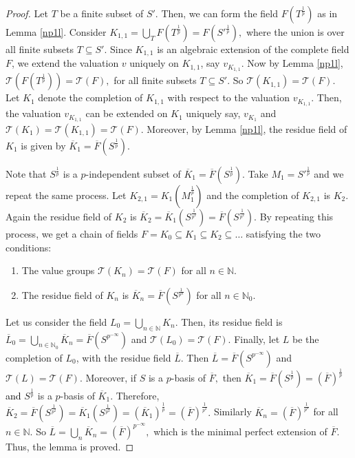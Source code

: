 \documentclass[times,10pt]{amsart}
\newcommand{\N}{\ensuremath{\mathbb{N}}}
\begin{document}
{\begin{proof}
Let $T$ be a finite subset of $S'$. Then, we can form the field $F\left(T^{\frac{1}{p}}\right)$ as in  Lemma \ref{np1l}.  Consider $K_{1,1}= {\bigcup}_T F\left(T^{\frac{1}{p}}\right)= F\left({S'}^{\frac{1}{p}}\right),$  where the union is over all finite subsets  $ T\subseteq S'.$ Since $K_{1,1}$ is an algebraic extension of the complete field $F$,   we  extend the valuation $v$ uniquely  on $K_{1,1}$, say $v_{K_{1,1}}$.   Now by  Lemma \ref{np1l},    $ \mathcal{T}\left(F\left(T^{\frac{1}{p}}\right)\right)= \mathcal{T}(F), $ for all  finite subsets  $T\subseteq S'$. So $  \mathcal{T}(K_{1,1})=\mathcal{T}(F)$.  Let $ K_1$ denote  the completion  of $ K_{1,1}$ with respect to the valuation $v_{K_{1,1}}$. Then, the valuation $v_{K_{1,1}}$ can be extended on $K_{1}$ uniquely say, $v_{K_1}$  and $ \mathcal{T}(K_1)= \mathcal{T}(K_{1,1})=\mathcal{T}( F)$. Moreover, by Lemma \ref{np1l}, the residue field of $ K_1$ is given by $\overline{K}_1=\overline{F}\left( S^{\frac{1}{p}}\right)$.
   
   Note that   $ S^{\frac{1}{p}}$ is a $p$-independent subset of $  \overline{K}_1= \overline{F}\left(S^{\frac{1}{p}}\right).$     Take  $M_1= {S'}^{\frac{1}{p}}$ and we repeat the same process. Let $K_{2,1}= K_1\left( M_1^{\frac{1}{p}}\right)$ and the completion of $K_{2,1}$ is $K_2.$  Again the residue field of $K_2$ is $\overline{K}_2= \overline{K}_1\left( S^{\frac{1}{p^2}}\right)= \overline{F}\left(S^{\frac{1}{p^2}}\right)$. By repeating this process,  we  get a  chain of fields $F=K_0\subseteq K_1\subseteq K_2\subseteq\ldots$ satisfying the two conditions:
\begin{enumerate}
\item[(1)] The value groups  $\mathcal{T}(K_n)=\mathcal{T}(F)$ for all $n\in \N$.
\item[(2)]  The residue field of $K_n$ is $\overline{K}_n= \overline{F}\left( S^{{\frac{1}{p^n}}}\right)$ for all $n\in \N_0$.
\end{enumerate}
Let us consider the field $L_0= {\bigcup}_{n\in \N} K_n$. Then, its residue field  is $ \overline{L}_0= {\bigcup}_{n\in \N_0} \overline{K}_n= \overline{F}\left( S^{p^{-\infty}}\right) $ and $ \mathcal{T}(L_0)=\mathcal{T}(F).$ Finally, let $L$ be the
 completion of $L_0$, with the residue field $\overline{L}$. Then $\overline{L}= \overline{F}\left( S^{p^{-\infty}}\right)$ and  $\mathcal{T}(L)=\mathcal{T}(F)$. Moreover, if $S$ is a $p$-basis of $ \overline{F},$ then $ \overline{K}_1= \overline{F}\left( S^{\frac{1}{p}}\right)= \left(\overline{F}\right)^{\frac{1}{p}} $ \textcolor{black}{and}     $ S^{\frac{1}{p}}$ is a $p$-basis of $ \overline{K}_1$. Therefore, $ \overline{K}_2= \overline{F}\left( S^{\frac{1}{p^2}}\right)  = \overline{K}_1\left( S^{\frac{1}{p^2}}\right)= \left(\overline{K}_1\right)^{\frac{1}{p}}  =\left( \overline{F}\right)^{\frac{1}{p^2}}.$ Similarly $ \overline{K}_n= \left(\overline{F}\right)^{\frac{1}{p^n}}$ for all $n \in \mathbb{N}$. So $ \overline{L}={\bigcup}_n\overline{K}_n= \left(\overline{F}\right)^{p^{-\infty}},$ which is the minimal perfect extension of $\overline{F}.$ Thus, the lemma is proved.\end{proof}
 \vspace{2mm}
 
}
\end{document}
